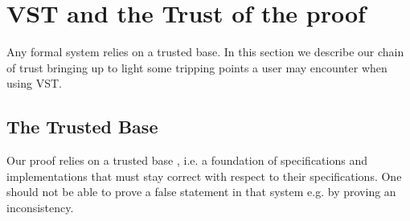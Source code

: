 \section{VST and the Trust of the proof}

Any formal system relies on a trusted base. In this section we describe our
chain of trust bringing up to light some tripping points a user may encounter
when using VST.

\subsection{The Trusted Base}

Our proof relies on a trusted base , i.e. a foundation of specifications
and implementations that must stay correct with respect to their specifications.
One should not be able to prove a false statement in that system e.g. by proving
an inconsistency.

